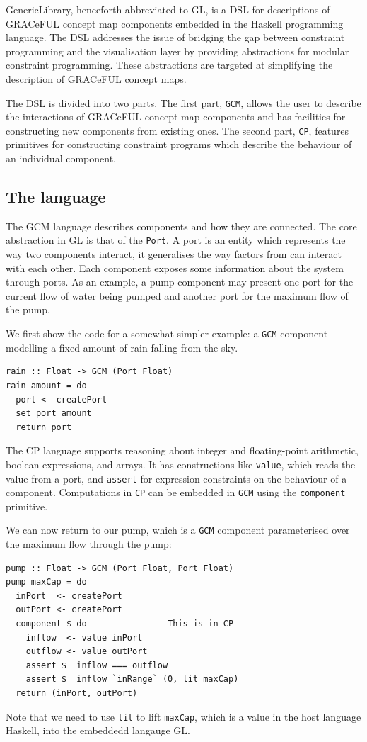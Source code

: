 GenericLibrary, henceforth abbreviated to GL, is a DSL for
descriptions of GRACeFUL concept map components embedded in the
Haskell programming language.
%
The DSL addresses the issue of bridging the gap between constraint
programming and the visualisation layer by providing abstractions for
modular constraint programming.
%
These abstractions are targeted at simplifying the description of
GRACeFUL concept maps.

The DSL is divided into two parts.
%
The first part, \texttt{GCM}, allows the user to describe the
interactions of GRACeFUL concept map components and has facilities for
constructing new components from existing ones.
%
The second part, \texttt{CP}, features primitives for constructing
constraint programs which describe the behaviour of an individual
component.

\subsection{The language}

The GCM language describes components and how they are connected.
%
The core abstraction in GL is that of the \texttt{Port}.
%
%
A port is an entity which represents the way two components interact,
it generalises the way factors from \cite{D4.1} can interact with each
other.
%
Each component exposes some information about the system through
ports.
%
As an example, a pump component may present one port for the current
flow of water being pumped and another port for the maximum flow of
the pump.

We first show the code for a somewhat simpler example: a \texttt{GCM}
component modelling a fixed amount of rain falling from the sky.
\begin{verbatim}
rain :: Float -> GCM (Port Float)
rain amount = do
  port <- createPort
  set port amount
  return port
\end{verbatim}

The CP language supports reasoning about integer and floating-point
arithmetic, boolean expressions, and arrays.
%
It has constructions like \texttt{value}, which reads the value from a
port, and \texttt{assert} for expression constraints on the behaviour
of a component.
%
Computations in \texttt{CP} can be embedded in \texttt{GCM} using the
\texttt{component} primitive.

We can now return to our pump, which is a \texttt{GCM} component
parameterised over the maximum flow through the pump:
%
\begin{verbatim}
pump :: Float -> GCM (Port Float, Port Float)
pump maxCap = do
  inPort  <- createPort
  outPort <- createPort
  component $ do             -- This is in CP
    inflow  <- value inPort
    outflow <- value outPort
    assert $  inflow === outflow
    assert $  inflow `inRange` (0, lit maxCap)
  return (inPort, outPort)
\end{verbatim}
%
Note that we need to use \texttt{lit} to lift \texttt{maxCap}, which
is a value in the host language Haskell, into the embeddedd langauge
GL.

